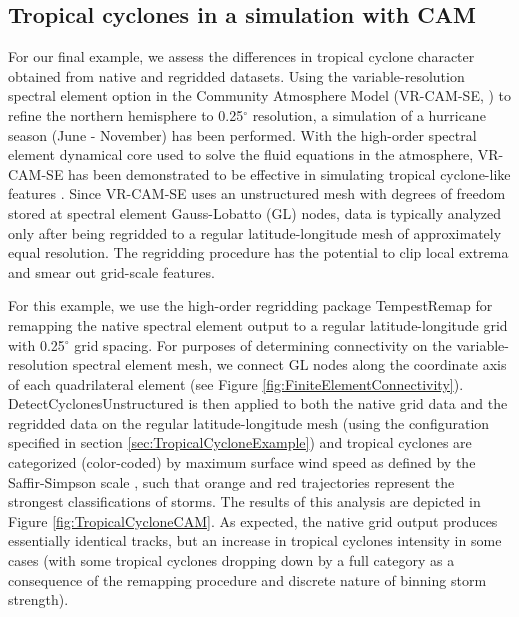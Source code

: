 \documentclass[gmdd, hvmath, online]{copernicus_discussions}
\begin{document}
\subsection{Tropical cyclones in a simulation with CAM} \label{sec:TropicalCycloneCAM}

For our final example, we assess the differences in tropical cyclone character obtained from native and regridded datasets. Using the variable-resolution spectral element option in the Community Atmosphere Model (VR-CAM-SE, \citet{Zarzycki2014APE}) to refine the northern hemisphere to 0.25$^\circ$ resolution, a simulation of a hurricane season (June - November) has been performed. With the high-order spectral element dynamical core used to solve the fluid equations in the atmosphere, VR-CAM-SE has been demonstrated to be effective in simulating tropical cyclone-like features \citep{zarzycki2014multidecadal, zarzycki2014using}. Since VR-CAM-SE uses an unstructured mesh with degrees of freedom stored at spectral element Gauss-Lobatto (GL) nodes, data is typically analyzed only after being regridded to a regular latitude-longitude mesh of approximately equal resolution.  The regridding procedure has the potential to clip local extrema and smear out grid-scale features.

For this example, we use the high-order regridding package TempestRemap \citep{ullrich2015arbitrary, ullrich2016arbitrary} for remapping the native spectral element output to a regular latitude-longitude grid with 0.25$^\circ$ grid spacing.  For purposes of determining connectivity on the variable-resolution spectral element mesh, we connect GL nodes along the coordinate axis of each quadrilateral element (see Figure \ref{fig:FiniteElementConnectivity}).  DetectCyclonesUnstructured is then applied to both the native grid data and the regridded data on the regular latitude-longitude mesh (using the configuration specified in section \ref{sec:TropicalCycloneExample}) and tropical cyclones are categorized (color-coded) by maximum surface wind speed as defined by the Saffir-Simpson scale \citep{Simpson1974}, such that orange and red trajectories represent the strongest classifications of storms.  The results of this analysis are depicted in Figure \ref{fig:TropicalCycloneCAM}.  As expected, the native grid output produces essentially identical tracks, but an increase in tropical cyclones intensity in some cases (with some tropical cyclones dropping down by a full category as a consequence of the remapping procedure and discrete nature of binning storm strength).
\end{document}
